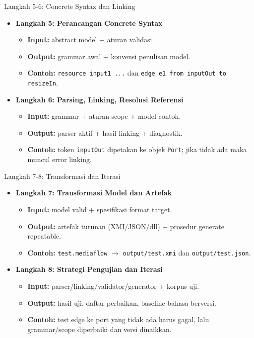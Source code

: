 \documentclass[aspectratio=169, table]{beamer}
\begin{document}
\begin{frame}{Langkah 5-6: Concrete Syntax dan Linking}
\scriptsize
\begin{itemize}
  \item \textbf{Langkah 5: Perancangan Concrete Syntax}
  \begin{itemize}
    \item \textbf{Input:} abstract model + aturan validasi.
    \item \textbf{Output:} grammar awal + konvensi penulisan model.
    \item \textbf{Contoh:} \texttt{resource input1 ...} dan \texttt{edge e1 from inputOut to resizeIn}.
  \end{itemize}
  \item \textbf{Langkah 6: Parsing, Linking, Resolusi Referensi}
  \begin{itemize}
    \item \textbf{Input:} grammar + aturan scope + model contoh.
    \item \textbf{Output:} parser aktif + hasil linking + diagnostik.
    \item \textbf{Contoh:} token \texttt{inputOut} dipetakan ke objek \texttt{Port}; jika tidak ada maka muncul error linking.
  \end{itemize}
\end{itemize}
\end{frame}

\begin{frame}{Langkah 7-8: Transformasi dan Iterasi}
\scriptsize
\begin{itemize}
  \item \textbf{Langkah 7: Transformasi Model dan Artefak}
  \begin{itemize}
    \item \textbf{Input:} model valid + spesifikasi format target.
    \item \textbf{Output:} artefak turunan (XMI/JSON/dll) + prosedur generate repeatable.
    \item \textbf{Contoh:} \texttt{test.mediaflow} $\rightarrow$ \texttt{output/test.xmi} dan \texttt{output/test.json}.
  \end{itemize}
  \item \textbf{Langkah 8: Strategi Pengujian dan Iterasi}
  \begin{itemize}
    \item \textbf{Input:} parser/linking/validator/generator + korpus uji.
    \item \textbf{Output:} hasil uji, daftar perbaikan, baseline bahasa berversi.
    \item \textbf{Contoh:} test edge ke port yang tidak ada harus gagal, lalu grammar/scope diperbaiki dan versi dinaikkan.
  \end{itemize}
\end{itemize}
\end{frame}
\end{document}
